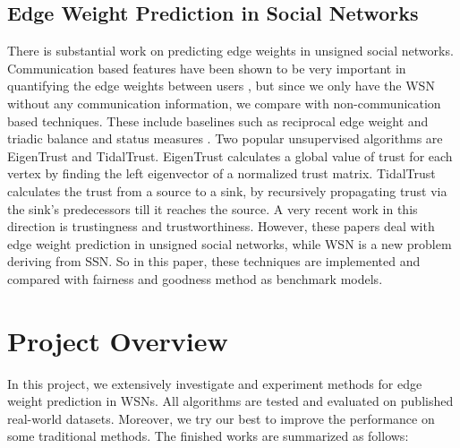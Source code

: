 \documentclass{article}
\begin{document}
\subsection{Edge Weight Prediction in Social Networks}
There is substantial work on predicting edge weights in unsigned social 
networks. Communication based features have been shown to be 
very important in quantifying the edge weights between 
users\cite{Gilbert:2012:PTS:2145204.2145360}\cite{Gilbert:2009:PTS:1518701.1518736}
\cite{Xiang:2010:MRS:1772690.1772790}\cite{Kahanda2009}, but 
since we only have the WSN without any communication information, 
we compare with non-communication based techniques. These 
include baselines such as reciprocal edge weight\cite{Gilbert:2012:PTS:2145204.2145360} 
and triadic balance and status measures\cite{Gilbert:2009:PTS:1518701.1518736}
\cite{Sintos:2014:UST:2623330.2623664}. Two popular unsupervised 
algorithms are EigenTrust\cite{Kamvar:2003:EAR:775152.775242} 
and TidalTrust\cite{Katz2006}. EigenTrust calculates a global 
value of trust for each vertex by finding the left eigenvector 
of a normalized trust matrix. TidalTrust calculates the trust 
from a source to a sink, by recursively propagating trust via 
the sink’s predecessors till it reaches the source. A very 
recent work in this direction is trustingness and 
trustworthiness\cite{Roy2016}. However, these papers deal with 
edge weight prediction in unsigned social networks, while WSN 
is a new problem deriving from SSN. So in this paper, these 
techniques are implemented and compared with fairness and goodness 
method as benchmark models.

\section{Project Overview}
In this project, we extensively investigate and experiment methods for edge weight prediction in WSNs. All algorithms are tested and evaluated on published real-world datasets. Moreover, we try our best to improve the performance on some traditional methods. The finished works are summarized as follows:
\end{document}
